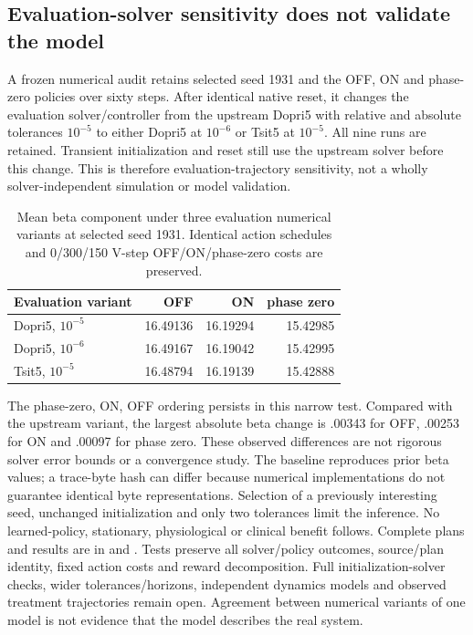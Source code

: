 \subsection{Evaluation-solver sensitivity does not validate the model}
A frozen numerical audit retains selected seed 1931 and the OFF, ON and phase-zero policies over sixty steps. After identical native reset, it changes the evaluation solver/controller from the upstream Dopri5 with relative and absolute tolerances $10^{-5}$ to either Dopri5 at $10^{-6}$ or Tsit5 at $10^{-5}$. All nine runs are retained. Transient initialization and reset still use the upstream solver before this change. This is therefore evaluation-trajectory sensitivity, not a wholly solver-independent simulation or model validation.
\begin{table}[ht]\centering
\caption{Mean beta component under three evaluation numerical variants at selected seed 1931. Identical action schedules and 0/300/150 V-step OFF/ON/phase-zero costs are preserved.}
\begin{tabular}{lrrr}\hline
Evaluation variant & OFF & ON & phase zero\\\hline
Dopri5, $10^{-5}$ &16.49136&16.19294&15.42985\\
Dopri5, $10^{-6}$ &16.49167&16.19042&15.42995\\
Tsit5, $10^{-5}$ &16.48794&16.19139&15.42888\\\hline
\end{tabular}\end{table}
The phase-zero, ON, OFF ordering persists in this narrow test. Compared with the upstream variant, the largest absolute beta change is .00343 for OFF, .00253 for ON and .00097 for phase zero. These observed differences are not rigorous solver error bounds or a convergence study. The baseline reproduces prior beta values; a trace-byte hash can differ because numerical implementations do not guarantee identical byte representations. Selection of a previously interesting seed, unchanged initialization and only two tolerances limit the inference. No learned-policy, stationary, physiological or clinical benefit follows.
Complete plans and results are in  and . Tests preserve all solver/policy outcomes, source/plan identity, fixed action costs and reward decomposition. Full initialization-solver checks, wider tolerances/horizons, independent dynamics models and observed treatment trajectories remain open. Agreement between numerical variants of one model is not evidence that the model describes the real system.

